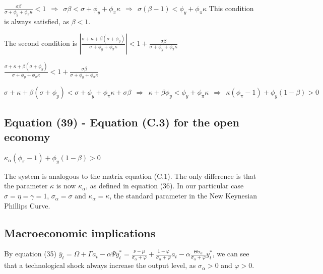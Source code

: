 \documentclass[
]{article}
\begin{document}
\(\displaystyle \frac{\sigma \beta}{\sigma+ \phi_y+\phi_\pi \kappa} <1 \ \ \Rightarrow \ \ \sigma \beta<\sigma+ \phi_y+\phi_\pi \kappa \ \ \Rightarrow \ \ \sigma (\beta-1)< \phi_y+\phi_\pi \kappa\)
This condition is always satisfied, as \(\beta<1\).

The second condition is
\(\displaystyle \left| \frac{\sigma+\kappa+ \beta(\sigma+\phi_y)}{\sigma+ \phi_y+\phi_\pi \kappa} \right|<1+\frac{\sigma \beta}{\sigma+ \phi_y+\phi_\pi \kappa}\)

\(\displaystyle \frac{\sigma+\kappa+ \beta(\sigma+\phi_y)}{\sigma+ \phi_y+\phi_\pi \kappa} < 1+\frac{\sigma \beta}{\sigma+ \phi_y+\phi_\pi \kappa}\)

\(\sigma+\kappa+ \beta(\sigma+\phi_y) < \sigma+ \phi_y+\phi_\pi \kappa + \sigma \beta \ \ \Rightarrow \ \ \kappa + \beta \phi_y<\phi_y+\phi_\pi \kappa \ \ \Rightarrow \ \ \kappa (\phi_\pi-1)+\phi_y(1-\beta)>0\)

\vspace{12pt}

\hypertarget{equation-39---equation-c.3-for-the-open-economy}{%
\subsection{Equation (39) - Equation (C.3) for the open
economy}\label{equation-39---equation-c.3-for-the-open-economy}}

\(\kappa_{\alpha} (\phi_\pi-1)+\phi_y(1-\beta)>0\)

\vspace{8pt}

The system is analogous to the matrix equation (C.1). The only
difference is that the parameter \(\kappa\) is now \(\kappa_{\alpha}\),
as defined in equation (36). In our particular case
\(\sigma=\eta=\gamma=1\), \(\sigma_\alpha=\sigma\) and
\(\kappa_\alpha=\kappa\), the standard parameter in the New Keynesian
Phillips Curve.

\vspace{12pt}

\hypertarget{macroeconomic-implications}{%
\subsection{Macroeconomic
implications}\label{macroeconomic-implications}}

By equation (35)
\(\displaystyle \overline{y}_t=\Omega+\Gamma a_t -\alpha \Psi y_t^*=\frac{\nu-\mu}{\sigma_\alpha+\varphi}+\frac{1+\varphi}{\sigma_\alpha+\varphi} a_t -\alpha \frac{\Theta \sigma_\alpha}{\sigma_\alpha+\varphi}y_t^*\),
we can see that a technological shock always increase the output level,
as \(\sigma_\alpha>0\) and \(\varphi>0\).
\end{document}
